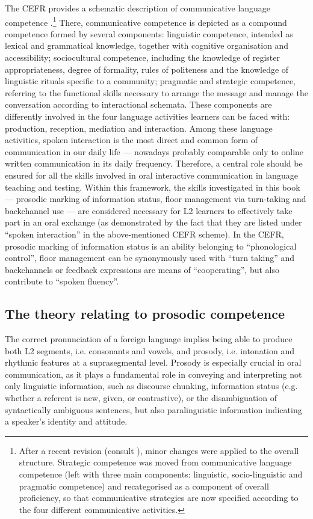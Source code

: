 The CEFR provides a schematic description of communicative language competence \citep{FiguerasEtAl2009}.\footnote{After a recent revision (consult \citealt{GoodierNorth2018}), minor changes were applied to the overall structure. Strategic competence was moved from communicative language competence (left with three main components: linguistic, socio-linguistic and pragmatic competence) and recategorised as a component of overall proficiency, so that communicative strategies are now specified according to the four different communicative activities.} There, communicative competence is depicted as a compound competence formed by several components: linguistic competence, intended as lexical and grammatical knowledge, together with cognitive organisation and accessibility; sociocultural competence, including the knowledge of register appropriateness, degree of formality, rules of politeness and the knowledge of linguistic rituals specific to a community; pragmatic and strategic competence, referring to the functional skills necessary to arrange the message and manage the conversation according to interactional schemata. These components are differently involved in the four language activities learners can be faced with: production, reception, mediation and interaction. Among these language activities, spoken interaction is the most direct and common form of communication in our daily life — nowadays probably comparable only to online written communication in its daily frequency. Therefore, a central role should be ensured for all the skills involved in oral interactive communication in language teaching and testing. Within this framework, the skills investigated in this book — prosodic marking of information status, floor management via turn-taking and backchannel use — are considered necessary for L2 learners to effectively take part in an oral exchange (as demonstrated by the fact that they are listed under “spoken interaction” in the above-mentioned CEFR scheme). In the CEFR, prosodic marking of information status is an ability belonging to “phonological control”, floor management can be synonymously used with “turn taking” and backchannels or feedback expressions are means of “cooperating”, but also contribute to “spoken fluency”.

\subsection{The theory relating to prosodic competence}
\label{sec:1.1.1}
The correct pronunciation of a foreign language implies being able to produce both L2 segments, i.e. consonants and vowels, and prosody, i.e. intonation and rhythmic features at a suprasegmental level. Prosody is especially crucial in oral communication, as it plays a fundamental role in conveying and interpreting not only linguistic information, such as discourse chunking, information status (e.g. whether a referent is new, given, or contrastive), or the disambiguation of syntactically ambiguous sentences, but also paralinguistic information indicating a speaker’s identity and attitude.

